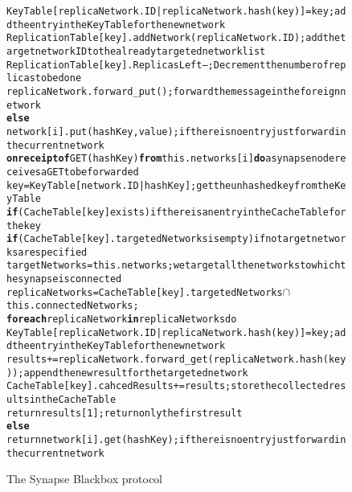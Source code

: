 \begin{figure*}[!t]
{\begin{alltt}
\AL    KeyTable[replicaNetwork.ID|replicaNetwork.hash(key)] = key; \hfill{\rm add the entry in the Key Table for the new network}
\AL    ReplicationTable[key].addNetwork(replicaNetwork.ID); \hfill{\rm add the target network ID to the already targeted network list}
\AL    ReplicationTable[key].ReplicasLeft--; \hfill{\rm Decrement the number of replicas to be done}
\AL    replicaNetwork.forward_put(); \hfill{\rm forward the message in the foreign network}
\AL \textbf{else}
\AL  network[i].put(hashKey, value); \hfill{\rm if there is no entry just forward in the current network}
\NA
\AL\textbf{on receipt of} GET(hashKey) \textbf{from} this.networks[i] \textbf{do}\hfill{\rm a synapse node receives a GET to be forwarded}
\AL key = KeyTable[network.ID|hashKey]; \hfill{\rm get the unhashed key from the Key Table}
\AL \textbf{if} (CacheTable[key] exists) \hfill{\rm if there is an entry in the Cache Table for the key}
\AL  \textbf{if} (CacheTable[key].targetedNetworks is empty) \hfill{\rm if no target networks are specified}
\AL   targetNetworks = this.networks; \hfill{\rm we target all the networks to which the synapse is connected}
\AL  replicaNetworks = CacheTable[key].targetedNetworks \(\cap\) this.connectedNetworks; 
\AL  \textbf{for each} replicaNetwork \textbf{in} replicaNetworks do
\AL   KeyTable[replicaNetwork.ID|replicaNetwork.hash(key)] = key; \hfill{\rm add the entry in the Key Table for the new network}
\AL   results += replicaNetwork.forward_get(replicaNetwork.hash(key)); \hfill{\rm append the new result for the targeted network}
\AL  CacheTable[key].cahcedResults += results; \hfill{\rm store the collected results in the Cache Table}
\AL  return results[1]; \hfill{\rm return only the first result}
\AL \textbf{else}
\AL  return network[i].get(hashKey); \hfill{\rm if there is no entry just forward in the current network}
\NA





\end{alltt}}
\caption{The Synapse Blackbox protocol \label{fig:lookupBB}}
\end{figure*}